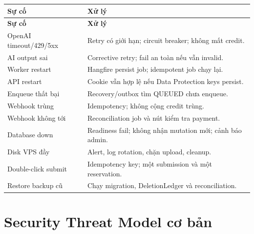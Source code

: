 \documentclass[11pt,a4paper]{article}
\begin{document}
\begin{longtable}{|P{0.25\textwidth}|P{0.65\textwidth}|}
\hline
\textbf{Sự cố} & \textbf{Xử lý} \\ \hline
\endfirsthead
\hline
\textbf{Sự cố} & \textbf{Xử lý} \\ \hline
\endhead
OpenAI timeout/429/5xx & Retry có giới hạn; circuit breaker; không mất credit. \\ \hline
AI output sai & Corrective retry; fail an toàn nếu vẫn invalid. \\ \hline
Worker restart & Hangfire persist job; idempotent job chạy lại. \\ \hline
API restart & Cookie vẫn hợp lệ nếu Data Protection keys persist. \\ \hline
Enqueue thất bại & Recovery/outbox tìm QUEUED chưa enqueue. \\ \hline
Webhook trùng & Idempotency; không cộng credit trùng. \\ \hline
Webhook không tới & Reconciliation job và nút kiểm tra payment. \\ \hline
Database down & Readiness fail; không nhận mutation mới; cảnh báo admin. \\ \hline
Disk VPS đầy & Alert, log rotation, chặn upload, cleanup. \\ \hline
Double-click submit & Idempotency key; một submission và một reservation. \\ \hline
Restore backup cũ & Chạy migration, DeletionLedger và reconciliation. \\ \hline
\end{longtable}

\section{Security Threat Model cơ bản}
\end{document}

